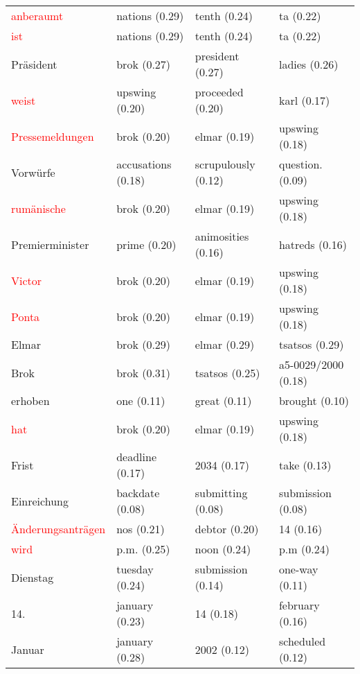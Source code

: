 \documentclass[11pt,twoside,openright]{mpreport}
\begin{document}
\begin{table}[H]
\begin{scriptsize}
\begin{tabular}{|llll|}
\textcolor{red}{anberaumt}               & nations (0.29) & tenth (0.24) & ta (0.22) \\
\textcolor{red}{ist}                     & nations (0.29) & tenth (0.24) & ta (0.22) \\
Präsident              & brok (0.27) & president (0.27) & ladies (0.26) \\ %
\textcolor{red}{weist}                   & upswing (0.20) & proceeded (0.20) & karl (0.17) \\
\textcolor{red}{Pressemeldungen}         & brok (0.20) & elmar (0.19) & upswing (0.18) \\
Vorwürfe               & accusations (0.18) & scrupulously (0.12) & question. (0.09) \\ %
\textcolor{red}{rumänische}             & brok (0.20) & elmar (0.19) & upswing (0.18) \\
Premierminister         & prime (0.20) & animosities (0.16) & hatreds (0.16) \\ %
\textcolor{red}{Victor}                  & brok (0.20) & elmar (0.19) & upswing (0.18) \\
\textcolor{red}{Ponta}                   & brok (0.20) & elmar (0.19) & upswing (0.18) \\
Elmar                   & brok (0.29) & elmar (0.29) & tsatsos (0.29) \\ %
Brok                    & brok (0.31) & tsatsos (0.25) & a5-0029/2000 (0.18) \\ %
erhoben                 & one (0.11) & great (0.11) & brought (0.10) \\ %
\textcolor{red}{hat}                     & brok (0.20) & elmar (0.19) & upswing (0.18) \\
Frist                   & deadline (0.17) & 2034 (0.17) & take (0.13) \\ %
Einreichung             & backdate (0.08) & submitting (0.08) & submission (0.08) \\ %
\textcolor{red}{Änderungsanträgen}     & nos (0.21) & debtor (0.20) & 14 (0.16) \\
\textcolor{red}{wird}                    & p.m. (0.25) & noon (0.24) & p.m (0.24) \\
Dienstag                & tuesday (0.24) & submission (0.14) & one-way (0.11) \\ %
14.                     & january (0.23) & 14 (0.18) & february (0.16) \\ %
Januar                  & january (0.28) & 2002 (0.12) & scheduled (0.12) \\ %

\end{tabular}
\end{scriptsize}
\end{table}
\end{document}
